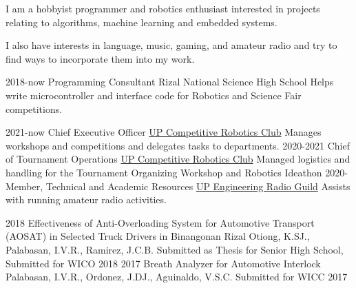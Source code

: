 \documentclass[9pt]{developercv}
\begin{document}
\begin{minipage}[t]{0.475\textwidth} 
	\vspace{-\baselineskip}

	I am a hobbyist programmer and robotics enthusiast interested in projects relating to algorithms, machine learning and embedded systems.

	I also have interests in language, music, gaming, and amateur radio and try to find ways to incorporate them into my work.


	\begin{entrylist}
		\entry
			{2018-now}
			{Programming Consultant}
			{Rizal National Science High School}
			{Helps write microcontroller and interface code for Robotics and Science Fair competitions. }
	\end{entrylist}
	\cvsect{Leadership}
	\begin{entrylist}
		\entry
			{2021-now}
			{Chief Executive Officer}
			{\href{https://upcrc.org}{UP Competitive Robotics Club}}
			{Manages workshops and competitions and delegates tasks to departments.}
		\entry
			{2020-2021}
			{Chief of Tournament Operations}
			{\href{https://upcrc.org}{UP Competitive Robotics Club}}
			{Managed logistics and handling for the Tournament Organizing Workshop and Robotics Ideathon}
		\entry
			{2020-}
			{Member, Technical and Academic Resources}
			{\href{https://up-erg.org}{UP Engineering Radio Guild}}
			{Assists with running amateur radio activities.}
	\end{entrylist}
	\cvsect{Publications}
	\begin{entrylist}
		\entry
			{2018}
			{Effectiveness of Anti-Overloading System for Automotive Transport (AOSAT) in Selected Truck Drivers in Binangonan Rizal}
			{Otiong, K.SJ., Palabasan, I.V.R., Ramirez, J.C.B.}
			{Submitted as Thesis for Senior High School, Submitted for WICO 2018}
		\entry
			{2017}
			{Breath Analyzer for Automotive Interlock}
			{Palabasan, I.V.R., Ordonez, J.DJ., Aguinaldo, V.S.C.}
			{Submitted for WICC 2017}
	\end{entrylist}

\end{minipage}
\hfill 
\end{document}
